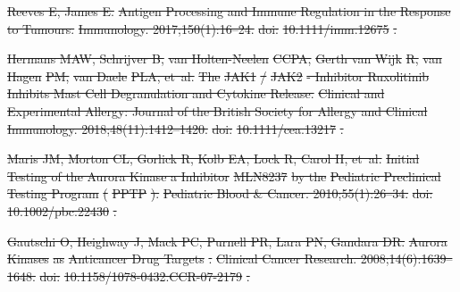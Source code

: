 \documentclass[10pt,letterpaper]{article}
\providecommand{\DIFdeltex}[1]{{\protect\color{red}\sout{#1}}}                      %
\providecommand{\DIFdel}[1]{\texorpdfstring{\DIFdeltex{#1}}{}} %
\begin{document}
\begin{thebibliography}{10}
\DIFdel{Reeves E, James E.
	}%
\DIFdel{Antigen Processing and Immune Regulation in the Response to Tumours.
	}%
\DIFdel{Immunology. 2017;150(1):16--24.
	}%
\DIFdel{doi:}%
\DIFdel{10.1111/imm.12675}%
\DIFdel{.
	}%

\DIFdel{Hermans MAW, Schrijver B, }%
\DIFdel{van Holten-Neelen}%
\DIFdel{CCPA, }%
\DIFdel{Gerth van Wijk}%
\DIFdel{R, }%
\DIFdel{van
		Hagen}%
\DIFdel{PM, }%
\DIFdel{van Daele}%
\DIFdel{PLA, et~al.
	}%
\DIFdel{The }%
\DIFdel{JAK1}%
\DIFdel{/}%
\DIFdel{JAK2}%
\DIFdel{- Inhibitor Ruxolitinib Inhibits Mast Cell
	Degranulation and Cytokine Release.
	}%
\DIFdel{Clinical and Experimental Allergy: Journal of the British Society for
	Allergy and Clinical Immunology. 2018;48(11):1412--1420.
	}%
\DIFdel{doi:}%
\DIFdel{10.1111/cea.13217}%
\DIFdel{.
	}%

\DIFdel{Maris JM, Morton CL, Gorlick R, Kolb EA, Lock R, Carol H, et~al.
	}%
\DIFdel{Initial Testing of the Aurora Kinase a Inhibitor }%
\DIFdel{MLN8237}%
\DIFdel{by the
	}%
\DIFdel{Pediatric Preclinical Testing Program}%
\DIFdel{(}%
\DIFdel{PPTP}%
\DIFdel{).
	}%
\DIFdel{Pediatric Blood \& Cancer. 2010;55(1):26--34.
	}%
\DIFdel{doi:}%
\DIFdel{10.1002/pbc.22430}%
\DIFdel{.
	}%

\DIFdel{Gautschi O, Heighway J, Mack PC, Purnell PR, Lara PN, Gandara DR.
	}%
\DIFdel{Aurora }%
\DIFdel{Kinases}%
\DIFdel{as }%
\DIFdel{Anticancer Drug Targets}%
\DIFdel{.
	}%
\DIFdel{Clinical Cancer Research. 2008;14(6):1639--1648.
	}%
\DIFdel{doi:}%
\DIFdel{10.1158/1078-0432.CCR-07-2179}%
\DIFdel{.
	}%


\end{thebibliography}
\end{document}
